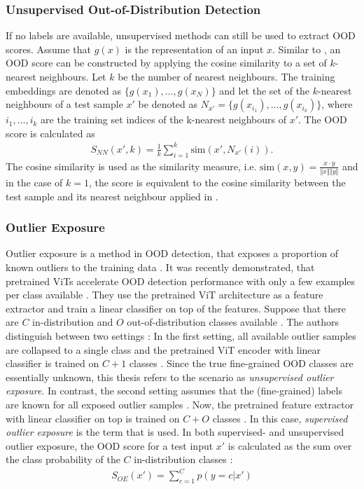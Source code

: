 \subsubsection{Unsupervised Out-of-Distribution Detection}
If no labels are available, unsupervised methods can still be used to extract OOD scores.
Assume that $g(x)$ is the representation of an input $x$.
Similar to \citep{Michels2023,Sun2022}, an OOD score can be constructed by applying the cosine similarity to a set of $k$-nearest neighbours.
Let $k$ be the number of nearest neighbours.
The training embeddings are denoted as $\{g(x_1),\dots,g(x_N)\}$ and let the set of the $k$-nearest neighbours of a test sample $x'$ be denoted as $N_{x'} = \{g(x_{i_1}),\dots,g(x_{i_k})\}$, where $i_1,\dots,i_k$ are the training set indices of the k-nearest neighbours of $x'$.
The OOD score is calculated as \citep{Michels2023,Sun2022}
\begin{align}
	S_{NN}(x',k) = \frac{1}{k}\sum_{i=1}^k \text{sim}(x',N_{x'}(i)).
	\label{equation:knn-score}
\end{align}
The cosine similarity is used as the similarity measure, i.e. $\text{sim}(x,y) = \frac{x\cdot y}{\Vert x \Vert \Vert y \Vert}$ and in the case of $k=1$, the score is equivalent to the cosine similarity between the test sample and its nearest neighbour applied in \citep{Michels2023}.
\subsubsection{Outlier Exposure}
Outlier exposure is a method in OOD detection, that exposes a proportion of known outliers to the training data \citep{Hendrycks2018}.
It was recently demonstrated, that pretrained ViTs accelerate OOD detection performance with only a few examples per class available \citep{Fort2021}.
They use the pretrained ViT architecture as a feature extractor and train a linear classifier on top of the features.
Suppose that there are $C$ in-distribution and $O$ out-of-distribution classes available \citep{Fort2021}.
The authors distinguish between two settings \citep{Fort2021}:
In the first setting, all available outlier samples are collapsed to a single class and the pretrained ViT encoder with linear classifier is trained on $C+1$ classes \citep{Fort2021,Thulasidasan2021}.
Since the true fine-grained OOD classes are essentially unknown, this thesis refers to the scenario as \textit{unsupervised outlier exposure}.
In contrast, the second setting assumes that the (fine-grained) labels are known for all exposed outlier samples \citep{Fort2021,Roy2021}.
Now, the pretrained feature extractor with linear classifier on top is trained on $C+O$ classes \citep{Fort2021}.
In this case, \textit{supervised outlier exposure} is the term that is used.
In both supervised- and unsupervised outlier exposure, the OOD score for a test input $x'$ is calculated as the sum over the class probability of the $C$ in-distribution classes \citep{Fort2021}:
\begin{align}
	S_{OE}(x') = \sum_{c=1}^{C}p(y=c|x') 
\end{align}
